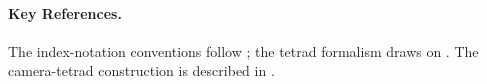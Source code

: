 





\paragraph{Key References.}
The index-notation conventions follow \cite{MTW1973}; the tetrad formalism
draws on \cite{Wald1984}. The camera-tetrad construction is described in
\cite{James2015}.
